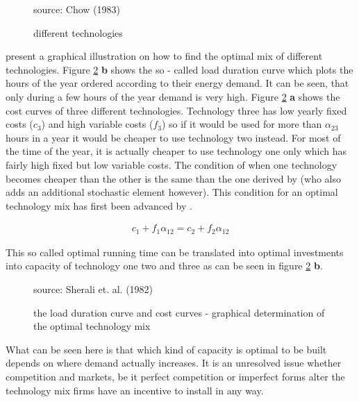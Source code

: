 \begin{figure}[h]
\centering
      \label{technology_choice_chow}            
      \caption{different technologies}
       source: Chow (1983)
\end{figure}

\cite{sherali1982} present a graphical illustration on how to find the optimal mix of different technologies. Figure \ref{technology_choice_sherali} \textbf{b} shows the so - called load duration curve which plots the hours of the year ordered according to their energy demand. It can be seen, that only during a few hours of the year demand is very high. Figure \ref{technology_choice_sherali} \textbf{a} shows the cost curves of three different technologies. Technology three has low yearly fixed costs ($c_3$) and high variable costs ($f_3$) so if it would be used for more than $\alpha_{23}$ hours in a year it would be cheaper to use technology two instead. For most of the time of the year, it is actually cheaper to use technology one only which has fairly high fixed but low variable costs. The condition of when one technology becomes cheaper than the other is the same than the one derived by \cite{chow1983} (who also adds an additional stochastic element however). This condition for an optimal technology mix has first been advanced by \cite{Turvey1968}.

\begin{eqnarray}
	c_1 + f_1 \alpha_{12} = c_2 + f_2 \alpha_{12}
\end{eqnarray}

This so called optimal running time can be translated into optimal investments into capacity of technology one two and three as can be seen in figure \ref{technology_choice_sherali} \textbf{b}.

\begin{figure}[h]
\centering
      \label{technology_choice_sherali}            
      \caption{the load duration curve and cost curves - graphical determination of the optimal technology mix}
      source: Sherali et. al. (1982)
\end{figure}

What can be seen here is that which kind of capacity is optimal to be built depends on where demand actually increases. It is an unresolved issue whether competition and markets, be it perfect competition or imperfect forms alter the technology mix firms have an incentive to install in any way.


